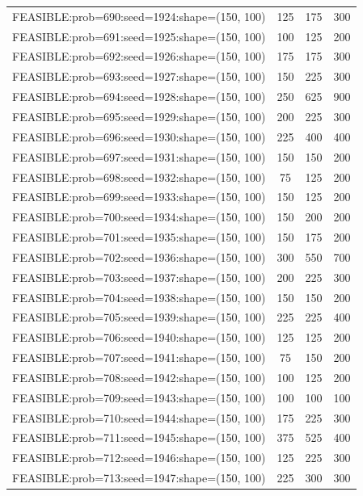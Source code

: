 \begin{longtable}{lccc}
FEASIBLE:prob=690:seed=1924:shape=(150, 100) &  125 &   175 &    300 \\
FEASIBLE:prob=691:seed=1925:shape=(150, 100) &  100 &   125 &    200 \\
FEASIBLE:prob=692:seed=1926:shape=(150, 100) &  175 &   175 &    300 \\
FEASIBLE:prob=693:seed=1927:shape=(150, 100) &  150 &   225 &    300 \\
FEASIBLE:prob=694:seed=1928:shape=(150, 100) &  250 &   625 &    900 \\
FEASIBLE:prob=695:seed=1929:shape=(150, 100) &  200 &   225 &    300 \\
FEASIBLE:prob=696:seed=1930:shape=(150, 100) &  225 &   400 &    400 \\
FEASIBLE:prob=697:seed=1931:shape=(150, 100) &  150 &   150 &    200 \\
FEASIBLE:prob=698:seed=1932:shape=(150, 100) &   75 &   125 &    200 \\
FEASIBLE:prob=699:seed=1933:shape=(150, 100) &  150 &   125 &    200 \\
FEASIBLE:prob=700:seed=1934:shape=(150, 100) &  150 &   200 &    200 \\
FEASIBLE:prob=701:seed=1935:shape=(150, 100) &  150 &   175 &    200 \\
FEASIBLE:prob=702:seed=1936:shape=(150, 100) &  300 &   550 &    700 \\
FEASIBLE:prob=703:seed=1937:shape=(150, 100) &  200 &   225 &    300 \\
FEASIBLE:prob=704:seed=1938:shape=(150, 100) &  150 &   150 &    200 \\
FEASIBLE:prob=705:seed=1939:shape=(150, 100) &  225 &   225 &    400 \\
FEASIBLE:prob=706:seed=1940:shape=(150, 100) &  125 &   125 &    200 \\
FEASIBLE:prob=707:seed=1941:shape=(150, 100) &   75 &   150 &    200 \\
FEASIBLE:prob=708:seed=1942:shape=(150, 100) &  100 &   125 &    200 \\
FEASIBLE:prob=709:seed=1943:shape=(150, 100) &  100 &   100 &    100 \\
FEASIBLE:prob=710:seed=1944:shape=(150, 100) &  175 &   225 &    300 \\
FEASIBLE:prob=711:seed=1945:shape=(150, 100) &  375 &   525 &    400 \\
FEASIBLE:prob=712:seed=1946:shape=(150, 100) &  125 &   225 &    300 \\
FEASIBLE:prob=713:seed=1947:shape=(150, 100) &  225 &   300 &    300 \\

\end{longtable}

